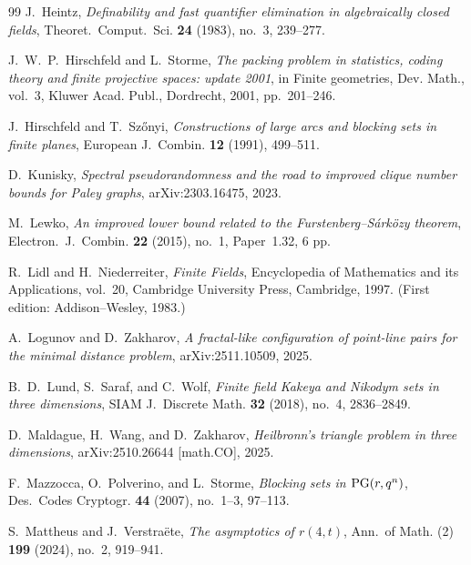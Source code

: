 \documentclass[12pt,reqno]{amsart}
\theoremstyle{plain}
\theoremstyle{definition}
\newcommand{\1}{\mathbf{1}}
\begin{document}
\begin{thebibliography}{99}
J.~Heintz,
\newblock \emph{Definability and fast quantifier elimination in algebraically closed fields},
\newblock Theoret.\ Comput.\ Sci. \textbf{24} (1983), no.~3, 239--277.

J.~W.~P.~Hirschfeld and L.~Storme,
\newblock \emph{The packing problem in statistics, coding theory and finite projective spaces: update 2001},
\newblock in Finite geometries, Dev. Math., vol.~3,
Kluwer Acad. Publ., Dordrecht, 2001, pp.~201--246.

J.~Hirschfeld and T.~Sz\H{o}nyi,
\newblock \emph{Constructions of large arcs and blocking sets in finite planes},
\newblock European J.\ Combin. \textbf{12} (1991), 499--511.

D.~Kunisky,
\newblock \emph{Spectral pseudorandomness and the road to improved clique number bounds for Paley graphs},
\newblock arXiv:2303.16475, 2023.

M.~Lewko,
\newblock \emph{An improved lower bound related to the Furstenberg--S\'ark\"ozy theorem},
\newblock Electron.\ J.\ Combin. \textbf{22} (2015), no.~1, Paper~1.32, 6 pp.

R.~Lidl and H.~Niederreiter,
\newblock \emph{Finite Fields},
\newblock Encyclopedia of Mathematics and its Applications, vol.~20,
Cambridge University Press, Cambridge, 1997.
\newblock (First edition: Addison--Wesley, 1983.)

A.~Logunov and D.~Zakharov,
\newblock \emph{A fractal-like configuration of point-line pairs for the minimal distance problem},
\newblock arXiv:2511.10509, 2025.

B.~D.~Lund, S.~Saraf, and C.~Wolf,
\newblock \emph{Finite field Kakeya and Nikodym sets in three dimensions},
\newblock SIAM J.\ Discrete Math. \textbf{32} (2018), no.~4, 2836--2849.

D.~Maldague, H.~Wang, and D.~Zakharov,
\newblock \emph{Heilbronn’s triangle problem in three dimensions},
\newblock arXiv:2510.26644 [math.CO], 2025.

F.~Mazzocca, O.~Polverino, and L.~Storme,
\newblock \emph{Blocking sets in ${\rm PG}(r,q^n)$},
\newblock Des.\ Codes Cryptogr. \textbf{44} (2007), no.~1--3, 97--113.

S.~Mattheus and J.~Verstra\"ete,
\newblock \emph{The asymptotics of $r(4,t)$},
\newblock Ann.\ of Math. (2) \textbf{199} (2024), no.~2, 919--941.


\end{thebibliography}
\end{document}
